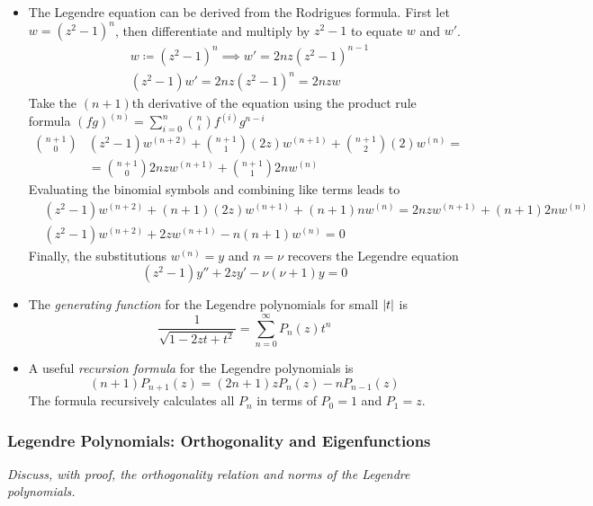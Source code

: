 \documentclass[11pt, a4paper]{article}
\newcommand{\question}[1]{\textit{#1}\vspace{2mm}}
\begin{document}
\begin{itemize}
	\item The Legendre equation can be derived from the Rodrigues formula. First let $ w = (z^{2} - 1)^{n} $, then differentiate and multiply by $ z^{2} - 1 $ to equate $ w $ and $ w' $.
	\begin{align*}
		&w \coloneqq (z^{2} - 1)^{n} \implies w' = 2nz(z^{2} - 1)^{n-1}\\
		&(z^{2} - 1) w' = 2nz (z^{2} - 1)^{n} = 2nz w
	\end{align*}
	Take the $ (n+1) $th derivative of the equation using the product rule formula $ (fg)^{(n)} = \sum_{i=0}^{n}\binom{n}{i}f^{(i)}g^{n-i} $
	\begin{align*}
		\textstyle\binom{n+1}{0} &(z^{2} - 1)w^{(n+2)} +  \textstyle\binom{n+1}{1}(2z)w^{(n+1)} + \binom{n+1}{2}(2)w^{(n)} =\\
		&= \textstyle\binom{n+1}{0}2nz w^{(n+1)} + \binom{n+1}{1}2n w^{(n)} 
	\end{align*}
	Evaluating the binomial symbols and combining like terms leads to
	\begin{align*}
		&(z^{2} - 1)w^{(n+2)} +  (n+1)(2z)w^{(n+1)} + (n+1) n w^{(n)} =
		2nz w^{(n+1)} + (n+1)2n w^{(n)} \\
		&(z^{2} - 1)w^{(n+2)} + 2zw^{(n+1)} - n(n+1) w^{(n)} = 0
	\end{align*}
	Finally, the substitutions $ w^{(n)} = y $ and $ n = \nu $ recovers the Legendre equation
	\begin{equation*}
		(z^{2} - 1)y'' + 2zy' - \nu(\nu+1) y= 0
	\end{equation*}

	\item The \textit{generating function} for the Legendre polynomials for small $ \abs{t} $ is
	\begin{equation*}
		\frac{1}{\sqrt{1-2zt+t^2}} = \sum_{n=0}^{\infty}P_n(z)t^n
	\end{equation*}
	
	\item A useful \textit{recursion formula} for the Legendre polynomials is
	\begin{equation*}
		(n+1)P_{n+1}(z) = (2n+1)zP_n(z) - nP_{n-1}(z)
	\end{equation*}
	The formula recursively calculates all $ P_{n} $ in terms of $ P_0 = 1 $ and $ P_1 = z $.
	
\end{itemize}

\subsubsection{Legendre Polynomials: Orthogonality and Eigenfunctions}
\question{Discuss, with proof, the orthogonality relation and norms of the Legendre polynomials. }
\end{document}
